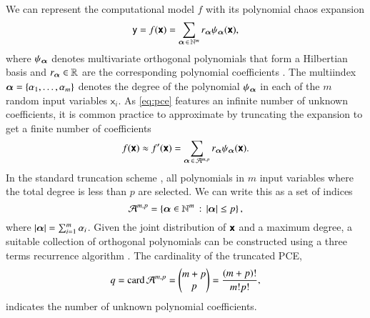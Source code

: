 We can represent the computational model $f$ with its polynomial chaos expansion
\begin{equation}
    \mathsf{y} = f(\boldsymbol{\mathsf{x}}) = \sum_{{\bm{\alpha}} \,\in\, \mathbb{N}^m} r_{{\bm{\alpha}}} \psi_{{\bm{\alpha}}}(\boldsymbol{\mathsf{x}}),
    \label{eq:pce}
\end{equation}
where $\psi_{\bm{\alpha}}$ denotes multivariate orthogonal polynomials that form
a Hilbertian basis and $r_{\bm{\alpha}} \in \mathbb{R}$ are the corresponding polynomial coefficients \cite{sudret_global_2008}. The multiindex ${\bm{\alpha}} = \{\alpha_1,\dots,\alpha_m\}$ 
denotes the degree of the polynomial $\psi_{\bm{\alpha}}$ in each of the $m$ random input variables $\mathsf{x}_i$.
As \cref{eq:pce} features an infinite number of unknown coefficients,
it is common practice to approximate by truncating the expansion to get a finite number of coefficients
\begin{equation}
    f(\boldsymbol{\mathsf{x}}) \approx f'(\boldsymbol{\mathsf{x}}) = \sum_{{\bm{\alpha}} \,\in\, \mathcal{A}^{m,p}} r_{\bm{\alpha}} \psi_{\bm{\alpha}}(\boldsymbol{\mathsf{x}}).
\end{equation}
In the standard truncation scheme \cite{gratiet_metamodel-based_2015,sudret_global_2008},
all polynomials in $m$ input variables where the total degree is less than $p$ are selected.
We can write this as a set of indices
\begin{equation}
    \mathcal{A}^{m,p} = \left\{{\bm{\alpha}} \in \mathbb{N}^m \,:\, \left|{\bm{\alpha}}\right| \leq p\right\},
\end{equation}
where $\left|{\bm{\alpha}}\right| = \sum_{i=1}^m \alpha_i$.
Given the joint distribution of $\boldsymbol{\mathsf{x}}$ and a maximum degree,
a suitable collection of orthogonal polynomials can be constructed
using a three terms recurrence algorithm \cite{feinberg_chaospy_2015}.
The cardinality of the truncated PCE,
\begin{equation}
    q = \text{card}\, \mathcal{A}^{m,p} = \left(\begin{matrix}
        m+p \\
        p
    \end{matrix}\right) = \frac{(m+p)!}{m!p!},
    \label{eq:cardinality}
\end{equation}
indicates the number of unknown polynomial coefficients.


